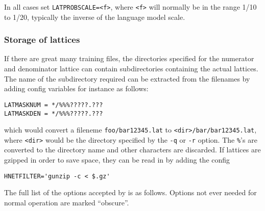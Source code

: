 In all cases set \texttt{LATPROBSCALE=<f>}, where \texttt{<f>} will
normally be in the range 1/10 to 1/20, typically the inverse of the
language model scale.



\subsubsection{Storage of lattices}

If there are great many training files, the directories specified for the numerator and denominator lattice
can contain subdirectories containing the actual lattices.  The name of the subdirectory required can
be extracted from the filenames by adding config variables for instance as follows:
\begin{verbatim}
LATMASKNUM = */%%%?????.???
LATMASKDEN = */%%%?????.???
\end{verbatim}
which would convert a fileneme \texttt{foo/bar12345.lat} to \texttt{<dir>/bar/bar12345.lat},
where \texttt{<dir>} would be the directory specified by the \texttt{-q} or \texttt{-r} option.
The \texttt{\%}'s are converted to the directory name and other characters are discarded.
If lattices are gzipped in order to save space, they can be read in by adding the 
config
\begin{verbatim}
HNETFILTER='gunzip -c < $.gz'
\end{verbatim}





The full list of the options accepted by  is as follows.
Options not ever needed for normal operation are marked ``obscure''.

